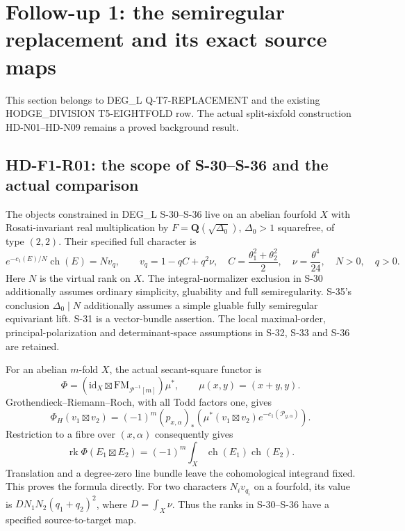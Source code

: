 \section{Follow-up 1: the semiregular replacement and its exact source maps}
\label{sec:f1-replacement}

This section belongs to DEG\_L Q-T7-REPLACEMENT and the existing
HODGE\_DIVISION T5-EIGHTFOLD row. The actual split-sixfold
construction HD-N01--HD-N09 remains a proved background result.

\subsection{HD-F1-R01: the scope of S-30--S-36 and the actual comparison}

The objects constrained in DEG\_L S-30--S-36 live on an abelian
fourfold $X$ with Rosati-invariant real multiplication by
$F=\mathbf Q(\sqrt{\Delta_0})$, $\Delta_0>1$ squarefree, of
type $(2,2)$. Their specified full character is
\[
 e^{-c_1(E)/N}\operatorname{ch}(E)=Nv_q,
 \qquad v_q=1-qC+q^2\nu,
 \quad C=\frac{\theta_1^2+\theta_2^2}{2},
 \quad\nu=\frac{\theta^4}{24},\quad N>0,\quad q>0.
 \tag{F1R1.1}
\]
Here $N$ is the virtual rank on $X$.
The integral-normalizer exclusion in S-30 additionally assumes
ordinary simplicity, gluability and full semiregularity.
S-35's conclusion $\Delta_0\mid N$ additionally assumes a simple
gluable fully semiregular equivariant lift. S-31 is a vector-bundle
assertion. The local maximal-order, principal-polarization and
determinant-space assumptions in S-32, S-33 and S-36 are retained.

For an abelian $m$-fold $X$, the actual secant-square functor is
\[
 \Phi=(\mathrm{id}_X\boxtimes\mathrm{FM}_{\mathcal P^{-1}[m]})
          \mu^*,\qquad \mu(x,y)=(x+y,y).
\]
Grothendieck--Riemann--Roch, with all Todd factors one, gives
\[
 \Phi_H(v_1\boxtimes v_2)=(-1)^m(p_{x,\alpha})_*
 \left(\mu^*(v_1\boxtimes v_2)e^{-c_1(\mathcal P_{y,\alpha})}\right).
 \tag{F1R1.2}
\]
Restriction to a fibre over $(x,\alpha)$ consequently gives
\[
 \operatorname{rk}\Phi(E_1\boxtimes E_2)
       =(-1)^m\int_X\operatorname{ch}(E_1)\operatorname{ch}(E_2).
 \tag{F1R1.3}
\]
Translation and a degree-zero line bundle leave the cohomological
integrand fixed. This proves the formula directly. For two characters
$N_iv_{q_i}$ on a fourfold, its value is
$DN_1N_2(q_1+q_2)^2$, where $D=\int_X\nu$.
Thus the ranks in S-30--S-36 have a specified source-to-target map.

